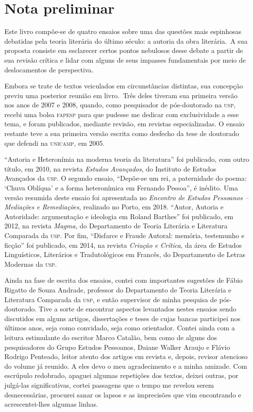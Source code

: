 \chapter*{Nota preliminar}

Este livro compõe-se de quatro ensaios sobre uma das questões mais espinhosas debatidas pela teoria literária do último século: a autoria da obra literária.~A sua proposta consiste em esclarecer certos pontos nebulosos desse debate a partir de sua revisão crítica e lidar com alguns de seus impasses fundamentais por meio de deslocamentos de perspectiva.

Embora se trate de textos veiculados em circunstâncias distintas, sua concepção previu uma posterior reunião em livro.~Três deles tiveram sua primeira versão nos anos de 2007 e 2008, quando, como pesquisador de pós-doutorado na \textsc{usp}, recebi uma bolsa \textsc{fapesp} para que pudesse me dedicar com exclusividade a esse tema, e foram publicados, mediante revisão, em revistas especializadas. O ensaio restante teve a sua primeira versão escrita como desfecho da tese de doutorado que defendi na \textsc{unicamp}, em 2005.

``Autoria e Heteronímia na moderna teoria da literatura'' foi publicado, com outro título, em 2010, na revista \emph{Estudos Avançados}, do Instituto de Estudos Avançados da \textsc{usp}. O segundo ensaio, ``Depõe-se um rei, a paternidade do poema: `Chuva Oblíqua' e a forma heteronímica em Fernando Pessoa'', é inédito. Uma versão resumida deste ensaio foi apresentada no \emph{Encontro de Estudos Pessoanos -- Mediações e Remediações}, realizado no Porto, em 2018.  ``Autor, Autoria e Autoridade: argumentação e ideologia em Roland Barthes'' foi publicado, em 2012, na revista \emph{Magma}, do Departamento de Teoria Literária e Literatura Comparada da \textsc{usp}. Por fim, ``Disfarce e Fraude Autoral: memória, testemunho e ficção'' foi publicado, em 2014, na revista \emph{Criação e Crítica}, da área de Estudos Linguísticos, Literários e Tradutológicos em Francês, do Departamento de Letras Modernas da \textsc{usp}. 

Ainda na fase de escrita dos ensaios, contei com importantes sugestões de Fábio Rigatto de Souza Andrade, professor do Departamento de Teoria Literária e Literatura Comparada da \textsc{usp}, e então supervisor de minha pesquisa de pós-doutorado. Tive a sorte de encontrar aspectos levantados nestes ensaios sendo discutidos em alguns artigos, dissertações e teses de cujas bancas participei nos últimos anos, seja como convidado, seja como orientador. Contei ainda com a leitura estimulante do escritor Marco Catalão, bem como de alguns dos pesquisadores do Grupo Estudos Pessoanos, Daiane Walker Araujo e Flávio Rodrigo Penteado, leitor atento dos artigos em revista e, depois, revisor atencioso do volume já reunido. A eles devo o meu agradecimento e a minha amizade. Com escrúpulo redobrado, apaguei algumas repetições dos textos, deixei outras, por julgá-las significativas, cortei passagens que o tempo me revelou serem desnecessárias, procurei sanar os lapsos e as imprecisões que vim encontrando e acrescentei-lhes algumas linhas. 

